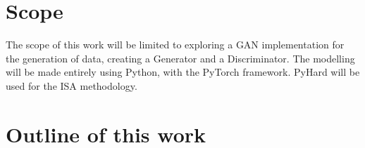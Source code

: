 \section{Scope}

The scope of this work will be limited to exploring a GAN implementation for the generation of data, creating a Generator and a Discriminator.  The modelling will be made entirely using Python, with the PyTorch \cite{paszke2019pytorch} framework. PyHard \cite{Lorena2022} will be used for the ISA methodology.




\section{Outline of this work}


